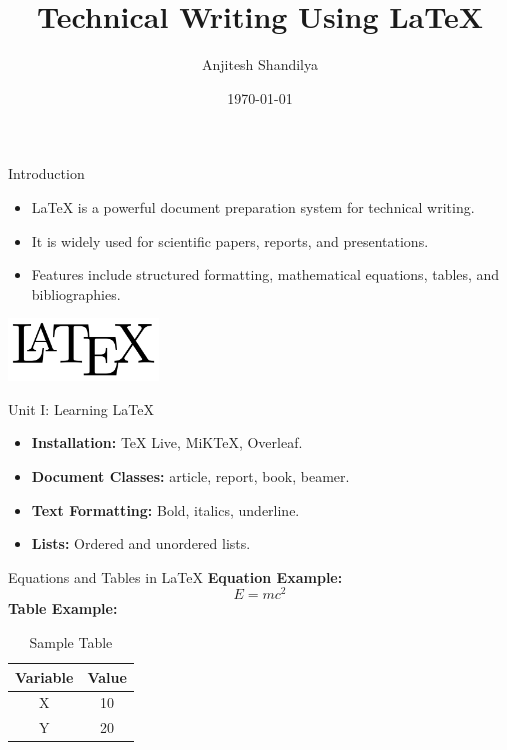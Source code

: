 \documentclass{beamer}
\title{Technical Writing Using LaTeX}
\author{Anjitesh Shandilya}
\date{\today}
\begin{document}
\frame{\titlepage}

\begin{frame}{Introduction}
    \begin{itemize}
        \item LaTeX is a powerful document preparation system for technical writing.
        \item It is widely used for scientific papers, reports, and presentations.
        \item Features include structured formatting, mathematical equations, tables, and bibliographies.
    \end{itemize}

     \hrulefill
     \hrulefill 
    \includegraphics[width=0.3\textwidth]{latex-logo.png} %
\end{frame}

\begin{frame}{Unit I: Learning LaTeX}
    \begin{itemize}
        \item \textbf{Installation:} TeX Live, MiKTeX, Overleaf.
        \item \textbf{Document Classes:} article, report, book, beamer.
        \item \textbf{Text Formatting:} Bold, italics, underline.
        \item \textbf{Lists:} Ordered and unordered lists.
    \end{itemize}

\end{frame}

\begin{frame}{Equations and Tables in LaTeX}
    \textbf{Equation Example:}
    \begin{equation}
        E = mc^2
    \end{equation}
    \textbf{Table Example:}
    \begin{table}[h]
        \centering
        \begin{tabular}{|c|c|}
            \hline
            Variable & Value \\
            \hline
            X & 10 \\
            Y & 20 \\
            \hline
        \end{tabular}
        \caption{Sample Table}
    \end{table}
\end{frame}
\end{document}
